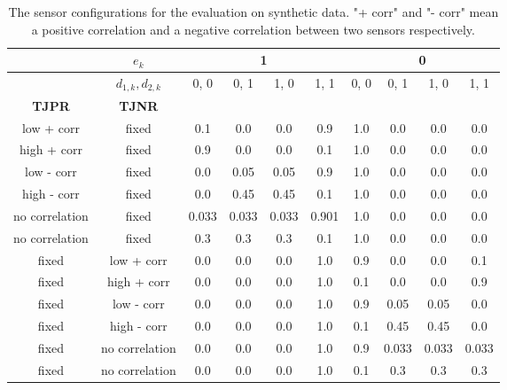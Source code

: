 \begin{table}
\begin{center}
 \begin{tabular}{| c | c || c | c | c | c || c | c | c | c|} 
 \hline
     & $e_k$ &  \multicolumn{4}{|c||}{1} &  \multicolumn{4}{c|}{0} \\
 \hline
 & $d_{1,k}, d_{2,k}$  & 0, 0 & 0, 1 & 1, 0 & 1, 1 & 0, 0 & 0, 1 & 1, 0  & 1, 1\\  
 \hline\hline
 \textbf{TJPR} & \textbf{TJNR} &  &  &  &  &  &  &  & \\  
 \hline
 \hline
 low + corr & fixed & 0.1 & 0.0 & 0.0 & 0.9 & 1.0 & 0.0 & 0.0 & 0.0\\  
 \hline
 high + corr & fixed & 0.9 & 0.0 & 0.0 & 0.1 & 1.0 & 0.0 & 0.0 & 0.0\\  
 \hline
 low - corr & fixed & 0.0 & 0.05 & 0.05 & 0.9 & 1.0 & 0.0 & 0.0 & 0.0\\  
 \hline
 high - corr & fixed & 0.0 & 0.45 & 0.45 & 0.1 & 1.0 & 0.0 & 0.0 & 0.0\\  
 \hline
 no correlation & fixed & 0.033 & 0.033 & 0.033 & 0.901 & 1.0 & 0.0 & 0.0 & 0.0\\  
 \hline
 no correlation & fixed & 0.3 & 0.3 & 0.3 & 0.1 & 1.0 & 0.0 & 0.0 & 0.0\\  
 \hline
 fixed & low + corr  & 0.0 & 0.0 & 0.0 & 1.0 & 0.9 & 0.0 & 0.0 & 0.1\\  
 \hline
 fixed & high + corr  & 0.0 & 0.0 & 0.0 & 1.0 & 0.1 & 0.0 & 0.0 & 0.9\\  
 \hline
 fixed & low - corr  & 0.0 & 0.0 & 0.0 & 1.0 & 0.9 & 0.05 & 0.05 & 0.0\\  
 \hline
 fixed & high - corr  & 0.0 & 0.0 & 0.0 & 1.0 & 0.1 & 0.45 & 0.45 & 0.0\\  
 \hline
 fixed & no correlation  & 0.0 & 0.0 & 0.0 & 1.0 & 0.9 & 0.033 & 0.033 & 0.033\\  
 \hline
 fixed & no correlation  & 0.0 & 0.0 & 0.0 & 1.0 & 0.1 & 0.3 & 0.3 & 0.3\\  
 \hline
\end{tabular}
\end{center}
\vspace{-13pt}
\caption{The sensor configurations for the evaluation on synthetic data. "+ corr" and "- corr" mean a positive correlation and a negative correlation between two sensors respectively.}
\label{tab:eval_sim}
\vspace{-15pt}
\end{table}



